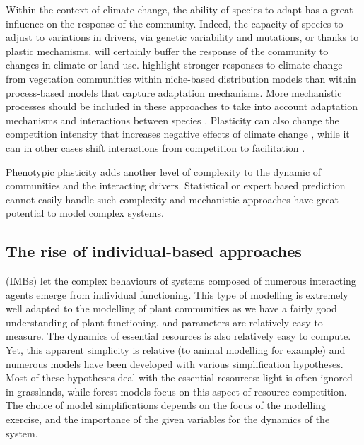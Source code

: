 Within the context of climate change, the ability of species to adapt has a great influence on the response of the community. Indeed, the capacity of species to adjust to variations in drivers, via genetic variability and mutations, or thanks to plastic mechanisms, will certainly buffer the response of the community to changes in climate or land-use. \cite{morin_comparing_2009} highlight stronger responses to climate change from vegetation communities within niche-based distribution models than within process-based models that capture adaptation mechanisms. More mechanistic processes should be included in these approaches \parencite{evans_towards_2016} to take into account adaptation mechanisms and interactions between species \parencite{gilman_framework_2010}. Plasticity can also change the competition intensity that increases negative effects of climate change  \parencite{hanel_phenotypic_2015}, while it can in other cases shift interactions from competition to facilitation  \parencite{callaway_phenotypic_2003}.

Phenotypic plasticity adds another level of complexity to the dynamic of communities and the interacting drivers. Statistical or expert based prediction cannot easily handle such complexity and mechanistic approaches have great potential to model complex systems.




\subsection{The rise of individual-based approaches}


 (IMBs) let the complex behaviours of systems composed of numerous interacting agents emerge from individual functioning. This type of modelling is extremely well adapted to the modelling of plant communities as we have a fairly good understanding of plant functioning, and parameters are relatively easy to measure. The dynamics of essential resources is also relatively easy to compute. Yet, this apparent simplicity is relative (to animal modelling for example) and numerous models have been developed with various simplification hypotheses. Most of these hypotheses deal with the essential resources: light is often ignored in grasslands, while forest models focus on this aspect of resource competition. The choice of model simplifications depends on the focus of the modelling exercise, and the importance of the given variables for the dynamics of the system.

